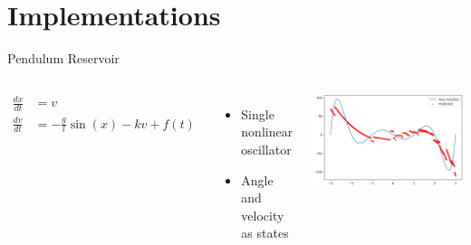 \documentclass{beamer}
\begin{document}
\section{Implementations}
\begin{frame}{Pendulum Reservoir}
  \begin{columns}
    \begin{equation*}
      \begin{aligned}
        \frac{dx}{dt} &= v \\
        \frac{dv}{dt} &= -\frac{g}{l}\sin(x) - kv + f(t)
      \end{aligned}
    \end{equation*}
    \begin{itemize}
      \item Single nonlinear oscillator
      \item Angle and velocity as states
    \end{itemize}
    
    \includegraphics[width=\textwidth]{figures/pendulum_result_0.png}
  \end{columns}
\end{frame}
\end{document}
